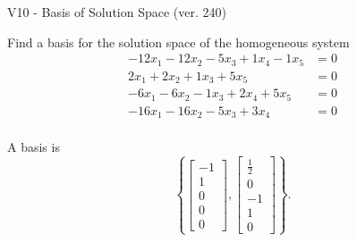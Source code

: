 \begin{exercise}
  \begin{exerciseTitle}V10 - Basis of Solution Space (ver. 240)\end{exerciseTitle}
  \begin{exerciseStatement}
    Find a basis for the solution space of the homogeneous system 
\begin{align*}
 -12 x_ 1 -12 x_ 2 -5 x_ 3 + 1 x_ 4 -1 x_ 5 &= 0  \\ 
  2 x_ 1 + 2 x_ 2 + 1 x_ 3 + 5 x_ 5 &= 0  \\ 
  -6 x_ 1 -6 x_ 2 -1 x_ 3 + 2 x_ 4 + 5 x_ 5 &= 0  \\ 
  -16 x_ 1 -16 x_ 2 -5 x_ 3 + 3 x_ 4 &= 0  \\ 
 \end{align*}


 
  \end{exerciseStatement}

  \begin{exerciseAnswer}
   A basis is   
\[\left\{\left[\begin{array}{c}
-1 \\
1 \\
0 \\
0 \\
0
\end{array}\right] , \left[\begin{array}{c}
\frac{1}{2} \\
0 \\
-1 \\
1 \\
0
\end{array}\right]\right\}.\]

  


  \end{exerciseAnswer}
\end{exercise}